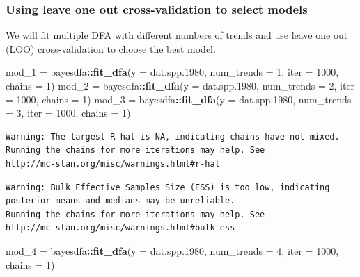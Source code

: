 \documentclass[
]{article}
\newenvironment{Shaded}{\begin{snugshade}}{\end{snugshade}}
\newcommand{\DataTypeTok}[1]{\textcolor[rgb]{0.13,0.29,0.53}{#1}}
\newcommand{\DecValTok}[1]{\textcolor[rgb]{0.00,0.00,0.81}{#1}}
\newcommand{\FloatTok}[1]{\textcolor[rgb]{0.00,0.00,0.81}{#1}}
\newcommand{\KeywordTok}[1]{\textcolor[rgb]{0.13,0.29,0.53}{\textbf{#1}}}
\newcommand{\NormalTok}[1]{#1}
\newcommand{\OperatorTok}[1]{\textcolor[rgb]{0.81,0.36,0.00}{\textbf{#1}}}
\newcommand{\StringTok}[1]{\textcolor[rgb]{0.31,0.60,0.02}{#1}}
\begin{document}
\hypertarget{sec-stan-loo}{%
\subsubsection{Using leave one out cross-validation to select
models}\label{sec-stan-loo}}

We will fit multiple DFA with different numbers of trends and use leave
one out (LOO) cross-validation to choose the best model.

\begin{Shaded}
\begin{Highlighting}[]
\NormalTok{mod_}\DecValTok{1}\NormalTok{ =}\StringTok{ }\NormalTok{bayesdfa}\OperatorTok{::}\KeywordTok{fit_dfa}\NormalTok{(}\DataTypeTok{y =}\NormalTok{ dat.spp}\FloatTok{.1980}\NormalTok{, }\DataTypeTok{num_trends =} \DecValTok{1}\NormalTok{, }\DataTypeTok{iter =} \DecValTok{1000}\NormalTok{, }
    \DataTypeTok{chains =} \DecValTok{1}\NormalTok{)}
\NormalTok{mod_}\DecValTok{2}\NormalTok{ =}\StringTok{ }\NormalTok{bayesdfa}\OperatorTok{::}\KeywordTok{fit_dfa}\NormalTok{(}\DataTypeTok{y =}\NormalTok{ dat.spp}\FloatTok{.1980}\NormalTok{, }\DataTypeTok{num_trends =} \DecValTok{2}\NormalTok{, }\DataTypeTok{iter =} \DecValTok{1000}\NormalTok{, }
    \DataTypeTok{chains =} \DecValTok{1}\NormalTok{)}
\NormalTok{mod_}\DecValTok{3}\NormalTok{ =}\StringTok{ }\NormalTok{bayesdfa}\OperatorTok{::}\KeywordTok{fit_dfa}\NormalTok{(}\DataTypeTok{y =}\NormalTok{ dat.spp}\FloatTok{.1980}\NormalTok{, }\DataTypeTok{num_trends =} \DecValTok{3}\NormalTok{, }\DataTypeTok{iter =} \DecValTok{1000}\NormalTok{, }
    \DataTypeTok{chains =} \DecValTok{1}\NormalTok{)}
\end{Highlighting}
\end{Shaded}

\begin{verbatim}
Warning: The largest R-hat is NA, indicating chains have not mixed.
Running the chains for more iterations may help. See
http://mc-stan.org/misc/warnings.html#r-hat
\end{verbatim}

\begin{verbatim}
Warning: Bulk Effective Samples Size (ESS) is too low, indicating posterior means and medians may be unreliable.
Running the chains for more iterations may help. See
http://mc-stan.org/misc/warnings.html#bulk-ess
\end{verbatim}

\begin{Shaded}
\begin{Highlighting}[]
\NormalTok{mod_}\DecValTok{4}\NormalTok{ =}\StringTok{ }\NormalTok{bayesdfa}\OperatorTok{::}\KeywordTok{fit_dfa}\NormalTok{(}\DataTypeTok{y =}\NormalTok{ dat.spp}\FloatTok{.1980}\NormalTok{, }\DataTypeTok{num_trends =} \DecValTok{4}\NormalTok{, }\DataTypeTok{iter =} \DecValTok{1000}\NormalTok{, }
    \DataTypeTok{chains =} \DecValTok{1}\NormalTok{)}
\end{Highlighting}
\end{Shaded}
\end{document}

